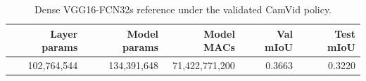 \begin{table}
\centering
\caption{Dense VGG16-FCN32s reference under the validated CamVid policy.}
\label{tab:dense-reference}
\begin{tabular}{rrrrr}
\toprule
Layer params & Model params & Model MACs & Val mIoU & Test mIoU \\
\midrule
102,764,544 & 134,391,648 & 71,422,771,200 & 0.3663 & 0.3220 \\
\bottomrule
\end{tabular}
\end{table}
